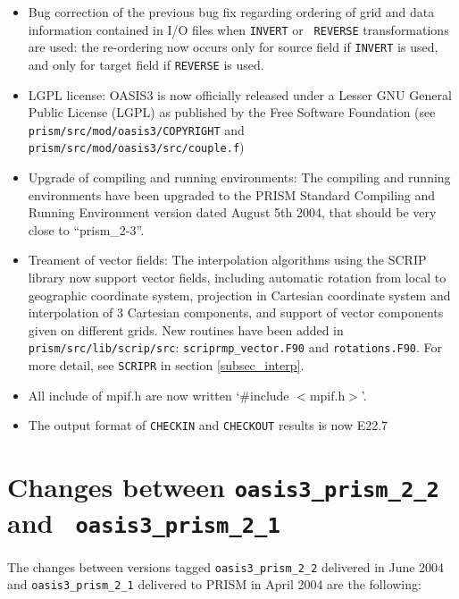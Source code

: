 \begin{itemize}

\item Bug correction of the previous bug fix regarding ordering of grid and
data information contained in I/O files when {\tt INVERT} or {\tt
REVERSE} transformations are used: the re-ordering now occurs only for
source field if {\tt INVERT} is used, and only for target field if
{\tt REVERSE} is used.

\item LGPL license: OASIS3 is now officially released under a Lesser GNU General Public
License (LGPL) as published by the Free Software Foundation
(see {\tt prism/src/mod/oasis3/COPYRIGHT} and {\tt prism/src/mod/oasis3/src/couple.f})

\item Upgrade of compiling and running environments: The compiling and
running environments have been upgraded to the PRISM Standard
Compiling and Running Environment version dated August 5th
2004, that should be very close to ``prism\_2-3''.

\item Treament of vector fields: The interpolation algorithms using the SCRIP library now support
vector fields, including automatic rotation from local to geographic
coordinate system, projection in Cartesian coordinate system and
interpolation of 3 Cartesian components, and support of vector
components given on different grids. New routines have been added in
{\tt prism/src/lib/scrip/src}: {\tt scriprmp\_vector.F90} and {\tt rotations.F90}.
For more detail, see {\tt SCRIPR} in section \ref{subsec_interp}.

\item All include of mpif.h are now written `\#include $<$mpif.h$>$'.

\item The output format of {\tt CHECKIN} and {\tt CHECKOUT} results
is now E22.7

\end{itemize}

\section{Changes between {\tt oasis3\_prism\_2\_2} and {\tt
oasis3\_prism\_2\_1}}

The changes between versions tagged {\tt oasis3\_prism\_2\_2}
delivered in June 2004 and {\tt oasis3\_prism\_2\_1} delivered to
PRISM in April 2004 are the following:

